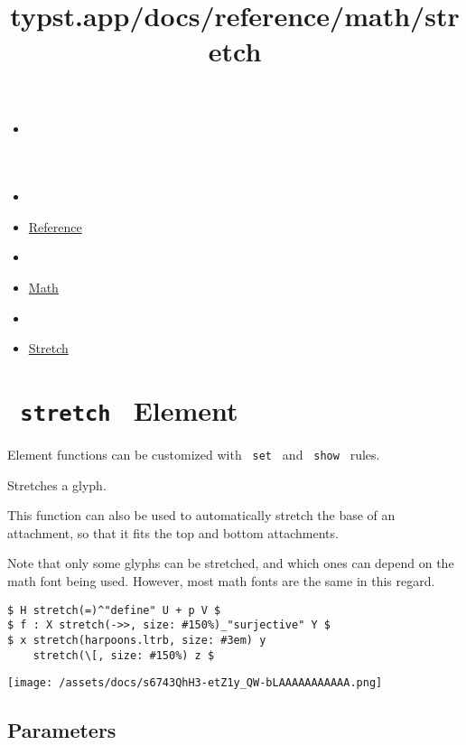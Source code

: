 \title{typst.app/docs/reference/math/stretch}

\begin{itemize}
\tightlist
\item
  \href{/docs}{}
\item
  
\item
  \href{/docs/reference/}{Reference}
\item
  
\item
  \href{/docs/reference/math/}{Math}
\item
  
\item
  \href{/docs/reference/math/stretch/}{Stretch}
\end{itemize}

\section{\texorpdfstring{\texttt{\ stretch\ } {{ Element
}}}{ stretch   Element }}\label{summary}

\label{element-tooltip}
Element functions can be customized with \texttt{\ set\ } and
\texttt{\ show\ } rules.

Stretches a glyph.

This function can also be used to automatically stretch the base of an
attachment, so that it fits the top and bottom attachments.

Note that only some glyphs can be stretched, and which ones can depend
on the math font being used. However, most math fonts are the same in
this regard.

\begin{verbatim}
$ H stretch(=)^"define" U + p V $
$ f : X stretch(->>, size: #150%)_"surjective" Y $
$ x stretch(harpoons.ltrb, size: #3em) y
    stretch(\[, size: #150%) z $
\end{verbatim}

\texttt{[image: /assets/docs/s6743QhH3-etZ1y\_QW-bLAAAAAAAAAAA.png]}

\subsection{\texorpdfstring{{ Parameters
}}{ Parameters }}\label{parameters}

